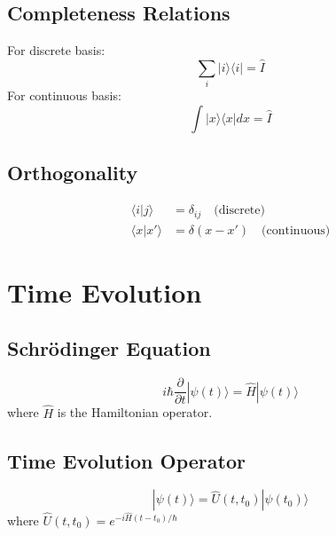 \documentclass{a3cheatsheet}
\begin{document}
\begin{multicols}{3}
\subsection{Completeness Relations}

\begin{formulabox}
For discrete basis:
$$\sum_i |i\rangle\langle i| = \hat{I}$$
For continuous basis:
$$\int |x\rangle\langle x| dx = \hat{I}$$
\end{formulabox}

\subsection{Orthogonality}

\begin{formulabox}
\begin{align}
\langle i|j\rangle &= \delta_{ij} \quad \text{(discrete)} \\
\langle x|x'\rangle &= \delta(x-x') \quad \text{(continuous)}
\end{align}
\end{formulabox}


\section{Time Evolution}

\subsection{Schrödinger Equation}

\begin{formulabox}
$$i\hbar\frac{\partial}{\partial t}|\psi(t)\rangle = \hat{H}|\psi(t)\rangle$$
where $\hat{H}$ is the Hamiltonian operator.
\end{formulabox}

\subsection{Time Evolution Operator}

\begin{formulabox}
$$|\psi(t)\rangle = \hat{U}(t,t_0)|\psi(t_0)\rangle$$
where $\hat{U}(t,t_0) = e^{-i\hat{H}(t-t_0)/\hbar}$
\end{formulabox}


\end{multicols}
\end{document}
